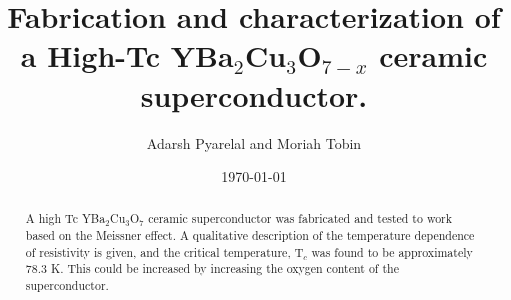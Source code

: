 \documentclass[aps,prl,twocolumn,groupedaddress]{revtex4}
\begin{document}

\title{Fabrication and characterization of a High-Tc YBa$_{2}$Cu$_{3}$O$_{7-x}$ ceramic superconductor.}


\author{Adarsh Pyarelal and Moriah Tobin}


\date{\today}

\begin{abstract}
A high Tc YBa$_{2}$Cu$_{3}$O$_{7}$ ceramic superconductor was fabricated and tested to work based on the Meissner effect. A qualitative description of the temperature dependence of resistivity is given, and the critical temperature, T$_{c}$ was found to be approximately 78.3 K. This could be increased by increasing the oxygen content of the superconductor.

\end{abstract}


\maketitle
\end{document}

